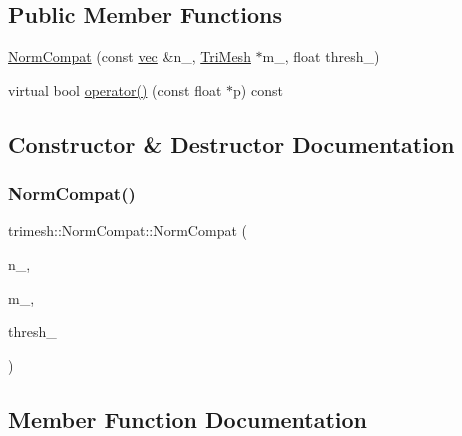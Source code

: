 \subsection*{Public Member Functions}
\begin{DoxyCompactItemize}
\item 
\hyperlink{classtrimesh_1_1NormCompat_a02e30b814330ed9960c50e5ee1abe54c}{Norm\+Compat} (const \hyperlink{namespacetrimesh_a4fc2b83feba99c931f837a0c7d4b4df1}{vec} \&n\+\_\+, \hyperlink{classtrimesh_1_1TriMesh}{Tri\+Mesh} $\ast$m\+\_\+, float thresh\+\_\+)
\item 
virtual bool \hyperlink{classtrimesh_1_1NormCompat_a189eaeb454dd63b4443661665b6500ee}{operator()} (const float $\ast$p) const
\end{DoxyCompactItemize}


\subsection{Constructor \& Destructor Documentation}
\mbox{\label{classtrimesh_1_1NormCompat_a02e30b814330ed9960c50e5ee1abe54c}} 
\subsubsection{\texorpdfstring{Norm\+Compat()}{NormCompat()}}
{\footnotesize\ttfamily trimesh\+::\+Norm\+Compat\+::\+Norm\+Compat (\begin{DoxyParamCaption}\item[{const \hyperlink{namespacetrimesh_a4fc2b83feba99c931f837a0c7d4b4df1}{vec} \&}]{n\+\_\+,  }\item[{\hyperlink{classtrimesh_1_1TriMesh}{Tri\+Mesh} $\ast$}]{m\+\_\+,  }\item[{float}]{thresh\+\_\+ }\end{DoxyParamCaption})\hspace{0.3cm}{\ttfamily [inline]}}



\subsection{Member Function Documentation}
\mbox{\label{classtrimesh_1_1NormCompat_a189eaeb454dd63b4443661665b6500ee}} 
